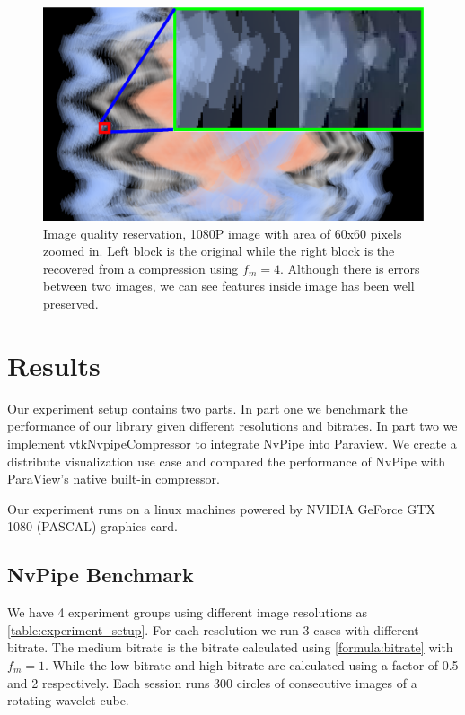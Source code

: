 \documentclass{vgtc}                          %
\begin{document}
\begin{figure}[h]
  \label{figure:quality}
  \centering
  \includegraphics[width=\columnwidth]{quality.eps}
  \caption{Image quality reservation, 1080P image with area of 60x60 pixels zoomed in. Left block is the original while the right block is the recovered from a compression using \(f_m=4\). Although there is errors between two images, we can see features inside image has been well preserved. }
\end{figure}

\section{Results}

Our experiment setup contains two parts. In part one we benchmark the performance of our library given different resolutions and bitrates. In part two we implement vtkNvpipeCompressor to integrate NvPipe into Paraview. We create a distribute visualization use case and compared the performance of NvPipe with ParaView's native built-in compressor.

Our experiment runs on a linux machines powered by NVIDIA GeForce GTX 1080 (PASCAL) graphics card.

\subsection{NvPipe Benchmark}

We have 4 experiment groups using different image resolutions as \ref{table:experiment_setup}. For each resolution we run 3 cases with different bitrate. The medium bitrate is the bitrate calculated using \ref{formula:bitrate} with \(f_m = 1\). While the low bitrate and high bitrate are calculated using a factor of 0.5 and 2 respectively. Each session runs 300 circles of consecutive images of a rotating wavelet cube.
\end{document}
